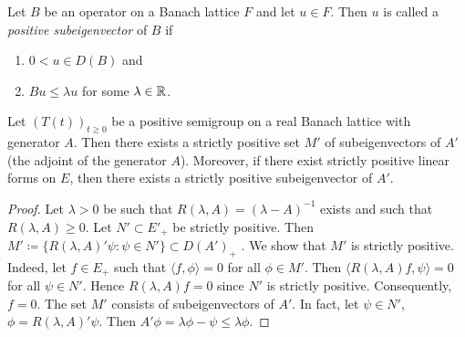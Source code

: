 \begin{definition}\label{def:c2-3.4}
%
%
%
Let $B$ be an operator on a Banach lattice $F$ and let $u \in F$.
Then $u$ is called a \emph{positive subeigenvector} of $B$ if
\begin{enumerate}[\upshape (i)]
\item \label{def:c2-3.4-1}
$0 < u \in D(B)$ and
\item \label{def:c2-3.4-2}
$Bu \leq \lambda u$ for some $\lambda \in \mathbb{R}$.
\end{enumerate}
\end{definition}
\begin{proposition}\label{prop:c2-3.5}
%
%
%
Let $(T(t))_{t \geq 0}$ be a positive semigroup on a real Banach lattice with generator $A$.
Then there exists a strictly positive set $M'$ of subeigenvectors of $A'$ (the adjoint of the generator $A$).
Moreover, if there exist strictly positive linear forms on $E$, then there exists a strictly positive subeigenvector of $A'$.
\end{proposition}
\begin{proof}
Let $\lambda > 0$ be such that $R(\lambda,A) = (\lambda - A)^{-1}$ exists and such that $R(\lambda,A) \geq 0$.
Let $N' \subset E'_{+}$ be strictly positive.
Then $M' \coloneq \{R(\lambda,A)'\psi \colon \psi \in N'\} \subset D(A')_{+}$ .
We show that $M'$ is strictly positive.
Indeed, let $f \in E_{+}$ such that $\langle f,\phi \rangle = 0$ for all $\phi \in M'$.
Then $\langle R(\lambda,A)f,\psi \rangle = 0$ for all $\psi \in N'$.
Hence $R(\lambda,A)f = 0$ since $N'$ is strictly positive.
Consequently, $f = 0$.
The set $M'$ consists of
subeigenvectors of $A'$. In fact, let $\psi \in N'$, $\phi = R(\lambda,A)'\psi$. Then
$A'\phi = \lambda\phi - \psi \leq \lambda\phi$.
\end{proof}

